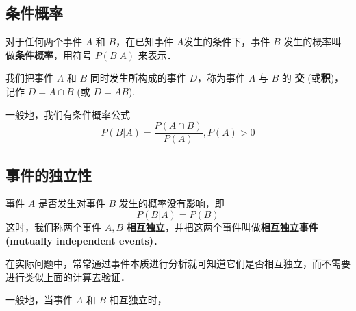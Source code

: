 
\begin{issues}
\issueDraft
\end{issues}

\subsection{条件概率}
对于任何两个事件 $A$ 和 $B$，在已知事件 $A$发生的条件下，事件 $B$ 发生的概率叫做\textbf{条件概率}，用符号 $P(B|A)$ 来表示．

我们把事件 $A$ 和 $B$ 同时发生所构成的事件 $D$，称为事件 $A$ 与 $B$ 的 \textbf{交} (或\textbf{积})，记作 $D = A \cap B$ (或 $D = AB$).

一般地，我们有条件概率公式
\begin{equation}
P(B|A) = \frac{P(A \cap B)}{P(A)},P(A)>0
\end{equation}

\subsection{事件的独立性}
事件 $A$ 是否发生对事件 $B$ 发生的概率没有影响，即
\begin{equation}
P(B|A) = P(B)
\end{equation}
这时，我们称两个事件 $A,B$ \textbf{相互独立}，并把这两个事件叫做\textbf{相互独立事件(mutually independent events)}．

在实际问题中，常常通过事件本质进行分析就可知道它们是否相互独立，而不需要进行类似上面的计算去验证．

一般地，当事件 $A$ 和 $B$ 相互独立时，